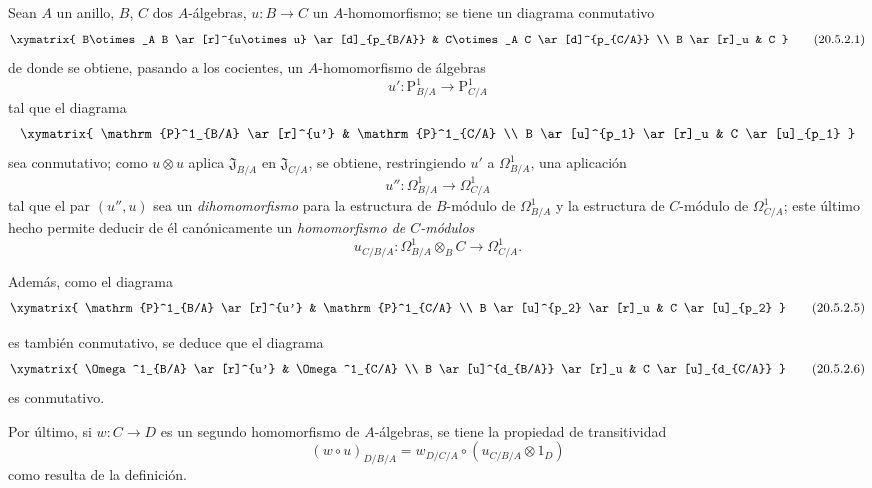 \begin{env}[20.5.2]
\label{0.20.5.2-fr}
Sean $A$ un anillo, $B$, $C$ dos $A$-álgebras, $u:B\to C$ un
$A$-homomorfismo; se tiene un diagrama conmutativo
\[
\xymatrix{
  B\otimes_A B \ar[r]^{u\otimes u} \ar[d]_{p_{B/A}} &
  C\otimes_A C \ar[d]^{p_{C/A}} \\
  B \ar[r]_u & C
}
\tag{20.5.2.1}
\label{0.20.5.2.1-fr}
\]
de donde se obtiene, pasando a los cocientes, un $A$-homomorfismo de álgebras
\begin{equation}
\tag{20.5.2.2}
\label{0.20.5.2.2-fr}
  u':\mathrm{P}^1_{B/A}\to\mathrm{P}^1_{C/A}
\end{equation}
tal que el diagrama
\[
\xymatrix{
  \mathrm{P}^1_{B/A} \ar[r]^{u'} & \mathrm{P}^1_{C/A} \\
  B \ar[u]^{p_1} \ar[r]_u & C \ar[u]_{p_1}
}
\]
sea conmutativo; como $u\otimes u$ aplica $\mathfrak{J}_{B/A}$ en
$\mathfrak{J}_{C/A}$, se obtiene, restringiendo $u'$ a
$\Omega^1_{B/A}$, una aplicación
\begin{equation}
\tag{20.5.2.3}
\label{0.20.5.2.3-fr}
  u'':\Omega^1_{B/A}\to\Omega^1_{C/A}
\end{equation}
tal que el par $(u'',u)$ sea un \emph{dihomomorfismo} para la
estructura de $B$-módulo de $\Omega^1_{B/A}$ y la estructura de $C$-módulo de
$\Omega^1_{C/A}$; este último hecho permite deducir de él canónicamente un
\emph{homomorfismo de $C$-módulos}
\begin{equation}
\tag{20.5.2.4}
\label{0.20.5.2.4-fr}
  u_{C/B/A}:\Omega^1_{B/A}\otimes_B C\to\Omega^1_{C/A}.
\end{equation}


Además, como el diagrama
\[
\xymatrix{
  \mathrm{P}^1_{B/A} \ar[r]^{u'} & \mathrm{P}^1_{C/A} \\
  B \ar[u]^{p_2} \ar[r]_u & C \ar[u]_{p_2}
}
\tag{20.5.2.5}
\label{0.20.5.2.5-fr}
\]

es también conmutativo, se deduce que el diagrama
\[
\xymatrix{
  \Omega^1_{B/A} \ar[r]^{u'} & \Omega^1_{C/A} \\
  B \ar[u]^{d_{B/A}} \ar[r]_u & C \ar[u]_{d_{C/A}}
}
\tag{20.5.2.6}
\label{0.20.5.2.6-fr}
\]
es conmutativo.

Por último, si $w:C\to D$ es un segundo homomorfismo de $A$-álgebras, se tiene la
propiedad de transitividad
\begin{equation}
\tag{20.5.2.7}
\label{0.20.5.2.7-fr}
  (w\circ u)_{D/B/A}
  =w_{D/C/A}\circ(u_{C/B/A}\otimes1_D)
\end{equation}
como resulta de la definición.
\end{env}

